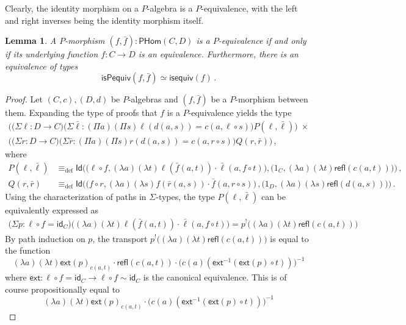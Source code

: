 \documentclass[10pt,a4paper,oneside,reqno]{amsart}
\numberwithin{equation}{section}
\theoremstyle{mythm}
\newtheorem{lemma}[theorem]{Lemma}
\theoremstyle{mydef}
\theoremstyle{myrmk}
\newcommand{\deq}{\equiv}
\newcommand{\defeq}{\deq_{\mathrm{def}}}
\newcommand{\co}{\colon}
\newcommand{\idfun}[1]{\mathsf{id}_{#1}}
\newcommand{\comp}{\circ}
\newcommand{\ext}{\mathsf{ext}}
\newcommand{\ct}{\cdot}
\newcommand{\Id}{\mathsf{Id}}
\newcommand{\refl}{\mathsf{refl}}
\newcommand{\WHom}{\mathsf{PHom}}
\begin{document}
Clearly, the identity morphism on a $P$-algebra is a $P$-equivalence, with the left and right inverses being the identity morphism itself.

\begin{lemma}\label{WAlgSpace} A $P$-morphism $(f, \bar{f}) \co \WHom(C,D)$ is a $P$-equivalence if and only
if its underlying function $f \co C \to D$ is an equivalence. Furthermore, there is an equivalence of types
\[
\mathsf{isPequiv}(f, \bar{f})  \simeq \mathsf{isequiv}(f) \, . 
\]
\end{lemma}  
\begin{proof}
Let $(C,c), (D,d)$ be $P$-algebras and $(f, \bar{f})$ be a $P$-morphism between them. Expanding the type of proofs that $f$ is a $P$-equivalence yields the type
\begin{multline*}
 \Big(\big(\Sigma \ell \co D \to  C \big) \big(\Sigma \bar{\ell} : (\Pi a) (\Pi s) \ell(d(a,s))=c(a,\ell \circ s)\big)
P(\ell,\bar{\ell})\Big) \; \times \\ 
 \Big(\big(\Sigma r \co D \to C \big) \big(\Sigma \bar{r} : (\Pi a) (\Pi s) r(d(a,s))=c(a,r \circ s) \big) Q(r,\bar{r})  \Big)\, , 
\end{multline*}
where
\begin{align*}
P(\ell,\bar{\ell}) & \defeq \Id \Big( \big( \ell \comp f, (\lambda a)(\lambda t) \ell(\bar{f}(a,t)) \ct \bar{\ell}(a, f \comp t)\big), \big( 1_C, (\lambda a)(\lambda t) \refl(c(a,t))\big) \Big)  \, , \\
Q(r,\bar{r})    & \defeq \Id \Big( \big( f \comp r, (\lambda a)(\lambda s) f(\bar{r}(a,s)) \ct \bar{f}(a, r \comp s)\big) \, , \big( 1_D, (\lambda a)(\lambda s) \refl(d(a,s)) \big) \Big) \, .
\end{align*}
Using the characterization of paths in $\Sigma$-types, the type $P(\ell,\bar{\ell})$ can be equivalently expressed as
\begin{align*}
\big(\Sigma p : \ell \comp f = \idfun{C} \big) \Big((\lambda a) (\lambda t) \ell(\bar{f}(a,t)) \ct \bar{\ell}(a, f \comp t)\Big) = p^{!} \Big((\lambda a) (\lambda t) \refl(c(a,t))\Big) 
\end{align*}
By path induction on $p$, the transport $p^{!} \Big((\lambda a) (\lambda t) \refl(c(a,t))\Big)$ is equal to the function
\[ (\lambda a) (\lambda t) \ext(p)_{c(a,t)} \ct \refl(c(a,t)) \ct \big(c(a)(\ext^{-1}(\ext(p) \circ t))\big)^{-1} \]
where $\ext : \ell \comp f = \idfun{C} \to \ell \comp f \sim \idfun{C}$ is the canonical equivalence. This is of course propositionally equal to
\[ (\lambda a) (\lambda t) \ext(p)_{c(a,t)} \ct \big(c(a)(\ext^{-1}(\ext(p) \circ t))\big)^{-1} \]

\end{proof}
\end{document}
